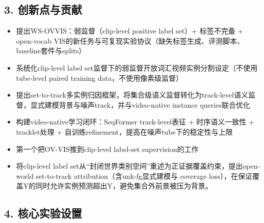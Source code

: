 \documentclass[UTF8]{ctexart}
\begin{document}
\subsection*{3. 创新点与贡献}
\begin{itemize}
\item 提出WS-OVVIS：弱监督（clip-level positive label set）+ 标签不完备 + open-vocab VIS的新任务与可复现实验协议（缺失标签生成、评测脚本、baseline套件与splits）
\item 系统化clip-level label set监督下的弱监督开放词汇视频实例分割设定（不使用tube-level paired training data，不使用像素级监督）
\item 提出set-to-track多实例归因框架，将集合级语义监督转化为track-level语义监督，显式建模背景与噪声track，并与video-native instance queries联合优化
\item 构建video-native学习闭环：SeqFormer track-level表征 + 时序语义一致性 + tracklet处理 + 自训练refinement，提高在噪声tube下的稳定性与上限
\item 第一个把OV-VIS推到clip-level label-set supervision的工作
\item 将clip-level label set从“封闭世界类别空间”重述为正证据覆盖约束，提出open-world set-to-track attribution（含unk-fg显式建模与 coverage loss），在保证覆盖Y的同时允许实例预测超出Y，避免集合外前景被压为背景。
\end{itemize}

\par\noindent\hrulefill\par


\subsection*{4. 核心实验设置}
\end{document}
